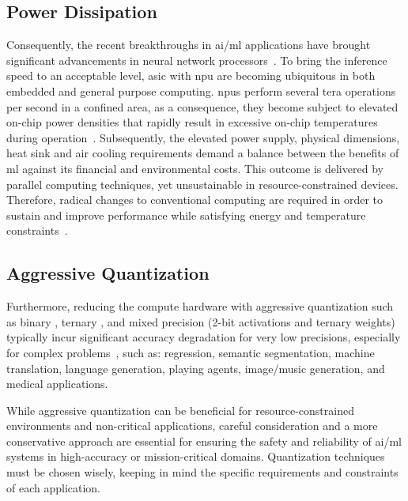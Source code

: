 \subsection{Power Dissipation}
Consequently, the recent breakthroughs in \gls{ai}/\gls{ml} applications have brought significant advancements in neural network processors~\cite{jouppi2017datacenter}. To bring the inference speed to an acceptable level, \gls{asic} with \gls{npu} are becoming ubiquitous in both embedded and general purpose computing. \glspl{npu} perform several tera operations per second in a confined area, as a consequence, they become subject to elevated on-chip power densities that rapidly result in excessive on-chip temperatures during operation~\cite{amrouch2020npu}. Subsequently, the elevated power supply, physical dimensions, heat sink and air cooling requirements demand a balance between the benefits of \gls{ml} against its financial and environmental costs. This outcome is delivered by parallel computing techniques, yet unsustainable in resource-constrained devices.
Therefore, radical changes to conventional computing are required in order to sustain and improve performance while satisfying energy and temperature constraints~\cite{gillani2020exploiting}.

\subsection{Aggressive Quantization}
Furthermore, reducing the compute hardware with aggressive quantization such as binary \cite{courbariaux2015binaryconnect}, ternary \cite{lin2015neural}, and mixed precision (2-bit activations and ternary weights) \cite{colangelo2018exploration} typically incur significant accuracy degradation for very low precisions, especially for complex problems~\cite{faraone2019addnet}, such as: regression, semantic segmentation, machine translation, language generation, playing agents, image/music generation, and medical applications.

While aggressive quantization can be beneficial for resource-constrained environments and non-critical applications, careful consideration and a more conservative approach are essential for ensuring the safety and reliability of \gls{ai}/\gls{ml} systems in high-accuracy or mission-critical domains. Quantization techniques must be chosen wisely, keeping in mind the specific requirements and constraints of each application.

